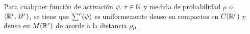 \begin{teorema}
    Para cualquier función de activación $\psi$, $r \in \mathbb{N}$ y
    medida de probabilidad $\mu$ o $(\mathbb{R}^r, B^r)$, 
    se tiene que $\sum^r (\psi)$ es uniformemente denso en compactos
    en $C(\mathbb{R}^r)$ y denso en $M(\mathbb{R}^r)$ de acorde a la distancia $\rho_{\mu}$. 
\end{teorema}